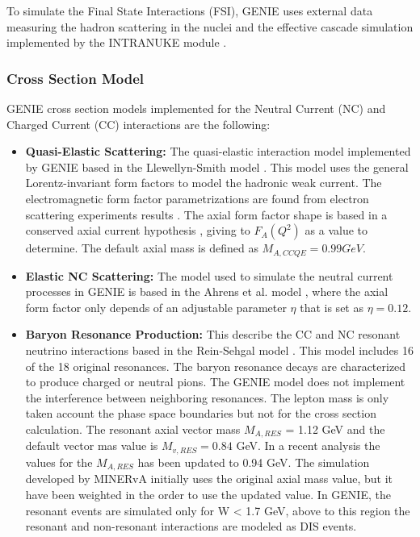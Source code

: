 To simulate the Final State Interactions (FSI), GENIE uses external data measuring the hadron scattering in the nuclei and the effective cascade simulation implemented by the INTRANUKE module \cite{Genie}. 


\subsubsection{Cross Section Model}
\label{Cap:Simulation:GENIE:CrossSectionModel}

GENIE cross section models implemented for the Neutral Current (NC) and Charged Current (CC) interactions are the following:

\begin{itemize}
    \item \textbf{Quasi-Elastic Scattering:} The quasi-elastic interaction model implemented by GENIE based in the Llewellyn-Smith model \cite{LLEWELLYNSMITH1972261}. This model uses the general Lorentz-invariant form factors to model the hadronic weak current. The electromagnetic form factor parametrizations are found from electron scattering experiments results \cite{BRADFORD2006127}. The axial form factor shape is based in a conserved axial current hypothesis \cite{LLEWELLYNSMITH1972261}, giving to $F_A(Q^2)$ as a value to determine. The default axial mass is defined as $M_{A,CCQE}=0.99GeV$.
    
    \item \textbf{Elastic NC Scattering:} The model used to simulate the neutral current processes in GENIE is based in the Ahrens et al. model \cite{Ahrens:PhysRevD.35.785}, where the axial form factor only depends of an adjustable parameter $\eta$ that is set as $\eta=0.12$. 
    
    \item \textbf{Baryon Resonance Production:} This describe the CC and NC resonant neutrino interactions based in the Rein-Sehgal model \cite{REIN198179}. This model includes 16 of the 18 original resonances. The baryon resonance decays are characterized to produce charged or neutral pions. The GENIE model does not implement the interference between neighboring resonances. The lepton mass is only taken account the phase space boundaries but not for the cross section calculation. The resonant axial vector mass $M_{A,RES}$ = 1.12 GeV\cite{Kuzmin:2006dh} and the default vector mas value is $M_{v,RES}=0.84$ GeV. In a recent analysis the values for the $M_{A,RES}$ has been updated to 0.94 GeV. The simulation developed by MINERvA initially uses the original axial mass value, but it have been weighted in the order to use the updated value. In GENIE, the resonant events are simulated only for W < 1.7 GeV, above to this region the resonant and non-resonant interactions are modeled as DIS events. 
    

\end{itemize}
